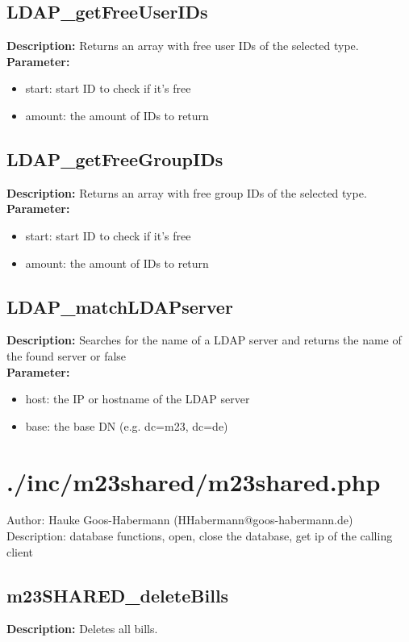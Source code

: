 \subsection{LDAP\_getFreeUserIDs}
\textbf{Description:} Returns an array with free user IDs of the selected type.\\
\textbf{Parameter:}
\begin{itemize}
\item start: start ID to check if it's free
\item amount: the amount of IDs to return
\end{itemize}

\subsection{LDAP\_getFreeGroupIDs}
\textbf{Description:} Returns an array with free group IDs of the selected type.\\
\textbf{Parameter:}
\begin{itemize}
\item start: start ID to check if it's free
\item amount: the amount of IDs to return
\end{itemize}

\subsection{LDAP\_matchLDAPserver}
\textbf{Description:} Searches for the name of a LDAP server and returns the name of the found server or false\\
\textbf{Parameter:}
\begin{itemize}
\item host: the IP or hostname of the LDAP server
\item base: the base DN (e.g. dc=m23, dc=de)
\end{itemize}

\newpage\section{./inc/m23shared/m23shared.php}
 Author: Hauke Goos-Habermann (HHabermann@goos-habermann.de)\\
 Description: database functions, open, close the database, get ip of the calling client\\

\subsection{m23SHARED\_deleteBills}
\textbf{Description:} Deletes all bills.\\

